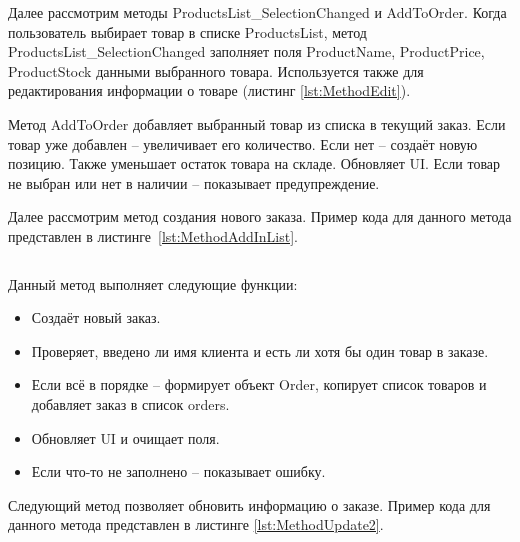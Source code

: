 \documentclass[12pt]{article}
\newcommand{\colorGIT}[1]{\textcolor{CtpLavender}{#1}}
\renewcommand{\texttt}[1]{{\small\ttfamily #1}}
\newenvironment{code}
  {\par\captionsetup{type=listing}\noindent}
  {\par\vspace{\baselineskip}}
\numberwithin{listing}{section}
\numberwithin{figure}{section}
\begin{document}

Далее рассмотрим методы \texttt{ProductsList\_SelectionChanged} и \texttt{AddToOrder}. Когда пользователь выбирает товар в списке \texttt{ProductsList}, метод \texttt{ProductsList\_SelectionChanged} заполняет поля \texttt{Product\-Name}, \texttt{ProductPrice}, \texttt{ProductStock} данными выбранного товара. Используется также для редактирования информации о товаре (листинг \ref{lst:MethodEdit}).

Метод \texttt{AddToOrder} добавляет выбранный товар из списка в текущий заказ.
Если товар уже добавлен -- увеличивает его количество.
Если нет -- создаёт новую позицию.
Также уменьшает остаток товара на складе.
Обновляет \texttt{UI}.
Если товар не выбран или нет в наличии -- показывает предупреждение.

{}

Далее рассмотрим метод создания нового заказа. Пример кода для данного метода
представлен в листинге~\ref{lst:MethodAddInList}.

\begin{code}
	\inputminted[firstline=186, lastline=216]{csharp}{../3lab/StoreManager/MainWindow.xaml.cs}
	\caption{\colorGIT{\href{https://github.com/WebMasterIT/Csharp_Labs/blob/ec375afd16c0647b337cf3d8a79c8bef904fc1be/3lab/StoreManager/MainWindow.xaml.cs\#L186-L216}{Метод}} добавления заказа}
	\label{lst:MethodAddInList}
\end{code}

\noindent Данный метод выполняет следующие функции:
\begin{itemize}
	\item Создаёт новый заказ.
	\item Проверяет, введено ли имя клиента и есть ли хотя бы один товар в заказе.
	\item Если всё в порядке -- формирует объект \texttt{Order}, копирует список товаров и добавляет заказ в список \texttt{orders}.
	\item Обновляет \texttt{UI} и очищает поля.
	\item Если что-то не заполнено -- показывает ошибку.
\end{itemize}

Следующий метод позволяет обновить информацию о заказе. Пример кода для данного метода представлен в листинге \ref{lst:MethodUpdate2}.

\begin{code}
	\inputminted[firstline=218, lastline=266]{csharp}{../3lab/StoreManager/MainWindow.xaml.cs}
	\caption{\colorGIT{\href{https://github.com/WebMasterIT/Csharp_Labs/blob/ec375afd16c0647b337cf3d8a79c8bef904fc1be/3lab/StoreManager/MainWindow.xaml.cs\#L218-L266}{Метод}} обновления заказа}
	\label{lst:MethodUpdate2}
\end{code}
\end{document}
